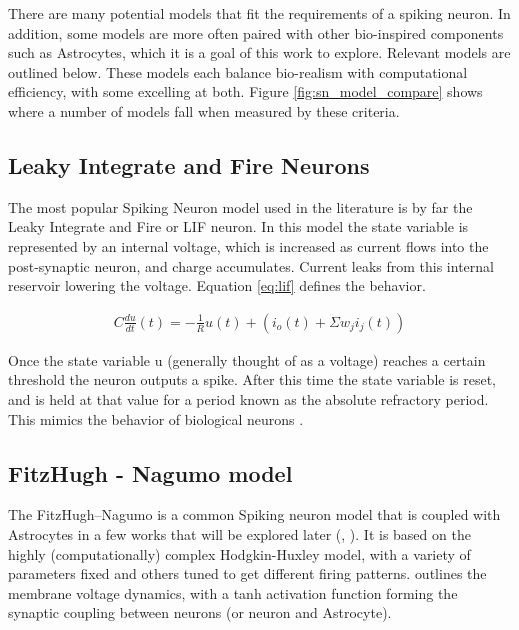     There are many potential models that fit the requirements of a spiking
    neuron. In addition, some models are more often paired with other
    bio-inspired components such as Astrocytes, which it is a goal of this work
    to explore. Relevant models are outlined below. These models each balance
    bio-realism with computational efficiency, with some excelling at
    both. Figure \ref{fig:sn_model_compare} shows where a number of models fall
    when measured by these criteria.
    

    \subsection{Leaky Integrate and Fire Neurons}
    The most popular Spiking Neuron model used in the literature is by far the
    Leaky Integrate and Fire or LIF neuron. In this model the state variable is
    represented by an internal voltage, which is increased as current flows into
    the post-synaptic neuron, and charge accumulates. Current leaks from this
    internal reservoir lowering the voltage. Equation \ref{eq:lif} defines the
    behavior.
    
    \begin{align}
        C \frac{du}{dt}(t) = -\frac{1}{R}u(t)+(i_o(t) + \Sigma w_ji_j(t))
    \end{align}
    
    Once the state variable u (generally thought of as a voltage) reaches a
    certain threshold the neuron outputs a spike. After this time the state
    variable is reset, and is held at that value for a period known as the
    absolute refractory period. This mimics the behavior of biological neurons
    \cite{ponulak_2011}.


    \subsection{FitzHugh - Nagumo model}
    The FitzHugh–Nagumo is a common Spiking neuron model that is coupled with
    Astrocytes in a few works that will be explored later (\cite{postnov_2009},
    \cite{postnov_2007}). It is based on the highly (computationally) complex
    Hodgkin-Huxley model, with a variety of parameters fixed and others tuned to
    get different firing patterns. \cite{postnov_2009} outlines the membrane
    voltage dynamics, with a tanh activation function forming the synaptic
    coupling between neurons (or neuron and Astrocyte).

